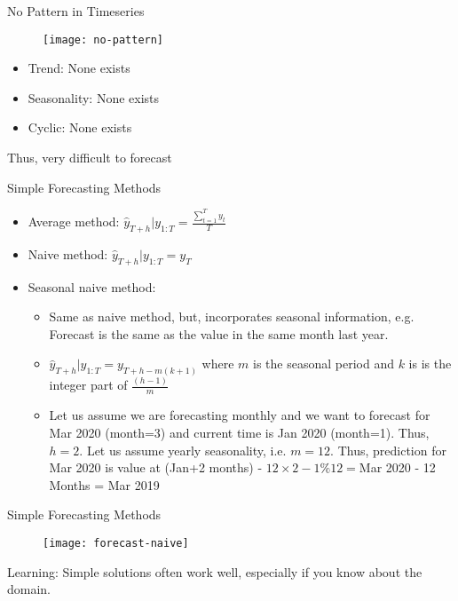 \documentclass{beamer}
\begin{document}
\begin{frame}{No Pattern in Timeseries}
\begin{figure}
	\centering
	\texttt{[image: no-pattern]}
	
	\vspace{-15pt}
	\label{fig:forecast}
\end{figure}

\begin{itemize}
\item Trend: None exists
	\item Seasonality: None exists
	\pause
\item Cyclic: None exists
\end{itemize}
Thus, very difficult to forecast
\end{frame}

\begin{frame}{Simple Forecasting Methods}
\begin{itemize}
\item Average method: $\hat{y}_{T+h}|y_{1:T} = \frac{\sum_{t =1}^{T}y_t}{T}$
	\item Naive method: $\hat{y}_{T+h}|y_{1:T} = y_T$
	\pause
\item Seasonal naive method: 
	\begin{itemize}
		\item Same as naive method, but, incorporates seasonal information, e.g. Forecast is the same as the value in the same month last year.
		\item $\hat{y}_{T+h}|{y_{1:T}} = y_{T+h-m(k+1)}$
		where $m$ is the seasonal period and $k$ is is the integer part of $\frac{(h-1)}{m}$ 
		\pause
\item Let us assume we are forecasting monthly and we want to forecast for Mar 2020 (month=3) and current time is Jan 2020 (month=1). Thus, $h=2$. Let us assume yearly seasonality, i.e. $m=12$. Thus, prediction for Mar 2020 is value at (Jan+2 months) - $12\times {2-1}\%{12} = $Mar 2020 - 12 Months = Mar 2019
	\end{itemize} 
	
\end{itemize}

\end{frame}

\begin{frame}{Simple Forecasting Methods}
\begin{figure}
	\centering
	\texttt{[image: forecast-naive]}
	
	\vspace{-15pt}
	\label{fig:forecast}
\end{figure}

Learning: Simple solutions often work well, especially if you know about the domain.
\end{frame}
\end{document}
